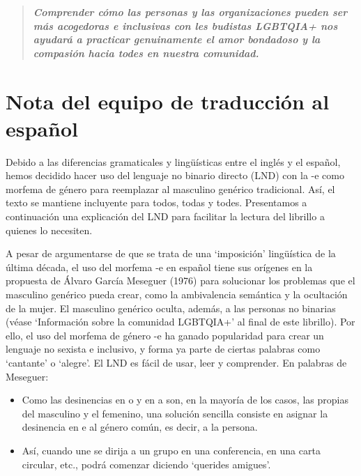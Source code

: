 \documentclass[12pt,openany]{book}
\begin{document}
\begin{quote}
\centering
\doublespacing
\textit{\Large \textbf{Comprender cómo las personas y las organizaciones pueden ser más acogedoras e inclusivas con les budistas LGBTQIA+ nos ayudará a practicar genuinamente el amor bondadoso y la compasión hacia todes en nuestra comunidad.}}
\end{quote}

\color{darkgray}
\setlength{\parindent}{15pt}
\chapter*{Nota del equipo de traducción al español}

Debido a las diferencias gramaticales y lingüísticas entre el inglés y el español, hemos decidido hacer uso del lenguaje no binario directo (LND) con la -e como morfema de género para reemplazar al masculino genérico tradicional. Así, el texto se mantiene incluyente para todos, todas y todes. Presentamos a continuación una explicación del LND para facilitar la lectura del librillo a quienes lo necesiten.

A pesar de argumentarse de que se trata de una `imposición' lingüística de la última década, el uso del morfema -e en español tiene sus orígenes en la propuesta de Álvaro García Meseguer (1976) para solucionar los problemas que el masculino genérico pueda crear, como la ambivalencia semántica y la ocultación de la mujer. El masculino genérico oculta, además, a las personas no binarias (véase `Información sobre la comunidad LGBTQIA+' al final de este librillo). Por ello, el uso del morfema de género -e ha ganado popularidad para crear un lenguaje no sexista e inclusivo, y forma ya parte de ciertas palabras como `cantante' o `alegre'. El LND es fácil de usar, leer y comprender. En palabras de Meseguer:

\begin{itemize}
\setlength\itemsep{-0.3em}
  \item Como las desinencias en o y en a son, en la mayoría de los casos, las propias del masculino y el femenino, una solución sencilla consiste en asignar la desinencia en e al género común, es decir, a la persona.
  \item Así, cuando une se dirija a un grupo en una conferencia, en una carta circular, etc., podrá comenzar diciendo `querides amigues'.
\end{itemize}
\end{document}
